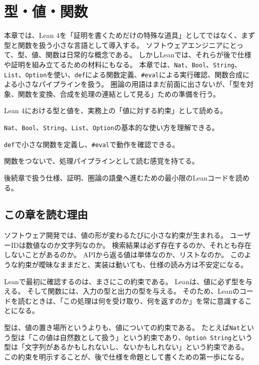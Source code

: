 \chapter{型・値・関数}
\label{chap:types-functions}

\begin{chapterabstract}
本章では、Lean 4を「証明を書くためだけの特殊な道具」としてではなく、まず型と関数を扱う小さな言語として導入する。
ソフトウェアエンジニアにとって、型、値、関数は日常的な概念である。
しかしLeanでは、それらが後で仕様や証明を組み立てるための材料にもなる。
本章では、\texttt{Nat}、\texttt{Bool}、\texttt{String}、\texttt{List}、\texttt{Option}を使い、\texttt{def}による関数定義、\texttt{\#eval}による実行確認、関数合成による小さなパイプラインを扱う。
圏論の用語はまだ前面に出さないが、「型を対象、関数を変換、合成を処理の連結として見る」ための準備を行う。
\end{chapterabstract}

\begin{learninggoals}
\item Lean 4における型と値を、実務上の「値に対する約束」として読める。
\item \texttt{Nat}、\texttt{Bool}、\texttt{String}、\texttt{List}、\texttt{Option}の基本的な使い方を理解できる。
\item \texttt{def}で小さな関数を定義し、\texttt{\#eval}で動作を確認できる。
\item 関数をつないで、処理パイプラインとして読む感覚を持てる。
\item 後続章で扱う仕様、証明、圏論の語彙へ進むための最小限のLeanコードを読める。
\end{learninggoals}

\section{この章を読む理由}

ソフトウェア開発では、値の形が変わるたびに小さな約束が生まれる。
ユーザーIDは数値なのか文字列なのか。
検索結果は必ず存在するのか、それとも存在しないことがあるのか。
APIから返る値は単体なのか、リストなのか。
このような約束が曖昧なままだと、実装は動いても、仕様の読み方は不安定になる。

Leanで最初に確認するのは、まさにこの約束である。
Leanは、値に必ず型を与える。
そして関数には、入力の型と出力の型を与える。
そのため、Leanのコードを読むときは、「この処理は何を受け取り、何を返すのか」を常に意識することになる。

\begin{intuitionbox}
型は、値の置き場所というよりも、値についての約束である。
たとえば\texttt{Nat}という型は「この値は自然数として扱う」という約束であり、\texttt{Option String}という型は「文字列があるかもしれないし、ないかもしれない」という約束である。
この約束を明示することが、後で仕様を命題として書くための第一歩になる。
\end{intuitionbox}

